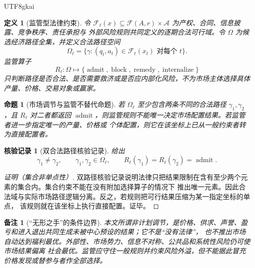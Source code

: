 \documentclass[12pt,a4paper,openany]{report}
\newtheorem{definition}{定义}[chapter]
\newtheorem{proposition}{命题}[chapter]
\newtheorem{remark}{备注}[chapter]
\newtheorem{Certificate}{核验记录}[chapter]
\newcommand{\Feas}{\mathcal F}
\newcommand{\Act}{\mathcal A}
\begin{document}
\begin{CJK*}{UTF8}{gkai}
\begin{definition}[监管型法律约束]
令 \(\Feas_\ell(x)\subseteq\Feas(A,r)\times\Act\) 为产权、合同、信息披露、竞争秩序、责任承担与
外部风险规则共同定义的逐期合法可行域。令 \(\Omega\) 为候选经济路径全集，并定义合法路径空间
\[
  \Omega_\ell
  =\{\gamma:(q_t,a_t)\in\Feas_\ell(x_t)\text{ 对每个 }t\}.
\]
监管算子
\[
  R_\ell:\Omega\longmapsto
  \{\operatorname{admit},\operatorname{block},\operatorname{remedy},
  \operatorname{internalize}\}
\]
只判断路径是否合法、是否需要救济或是否应内部化风险，不为市场主体选择具体产量、价格、交易对象或赢家。
\end{definition}

\begin{proposition}[市场调节与监管不替代命题]
\label{prop:market-regulation-nonsubstitution}
若 \(\Omega_\ell\) 至少包含两条不同的合法路径 \(\gamma_1,\gamma_2\)，且 \(R_\ell\) 对二者都返回
\(\operatorname{admit}\)，则监管规则不能唯一决定市场配置结果。若监管者进一步指定唯一的产量、价格或
个体配置，则它在该坐标上已从一般约束者转为直接配置者。
\end{proposition}

\begin{Certificate}[双合法路径核验记录]
给出
\[
  \gamma_1\ne\gamma_2,\qquad
  \gamma_1,\gamma_2\in\Omega_\ell,\qquad
  R_\ell(\gamma_1)=R_\ell(\gamma_2)=\operatorname{admit}.
\]
\end{Certificate}

\begin{proof}[证明（集合非单点性）]
双路径核验记录说明法律只把结果限制在含有至少两个元素的集合内。集合约束不能在没有附加选择算子的情况下
推出唯一元素。因此合法域与实际市场路径逻辑分离。反之，若规则把可行结果压缩为某一指定坐标的单点，
该规则就在该坐标上执行直接配置。证毕。
\end{proof}

\begin{remark}[“无形之手”的条件边界]
本文所谓非计划调节，是价格、供求、声誉、盈亏和进入退出共同生成未被中心预设的结果；它不是“没有法律”，
也不推出市场自动达到福利最优。外部性、市场势力、信息不对称、公共品和系统性风险仍可使市场结果偏离
社会最优。监管应守住一般规则并约束风险外溢，但不能据此冒充价格发现或替参与者作全部选择。
\end{remark}


\end{CJK*}
\end{document}
